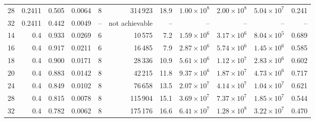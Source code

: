 \documentclass[11pt]{article}
\begin{document}
{\begin{longtable}{rrrrrrrrrrr}
28 & 0.2411 & 0.505 & 0.0064 & 8 & 314\,923 & 18.9 & $1.00\times10^{8}$ & $2.00\times10^{8}$ & $5.04\times10^{7}$ & 0.241 \\
32 & 0.2411 & 0.442 & 0.0049 & -- & not achievable & -- & -- & -- & -- & -- \\
14 & 0.4 & 0.933 & 0.0269 & 6 & 10\,575 & 7.2 & $1.59\times10^{6}$ & $3.17\times10^{6}$ & $8.04\times10^{5}$ & 0.689 \\
16 & 0.4 & 0.917 & 0.0211 & 6 & 16\,485 & 7.9 & $2.87\times10^{6}$ & $5.74\times10^{6}$ & $1.45\times10^{6}$ & 0.585 \\
18 & 0.4 & 0.900 & 0.0171 & 8 & 28\,336 & 10.9 & $5.61\times10^{6}$ & $1.12\times10^{7}$ & $2.83\times10^{6}$ & 0.602 \\
20 & 0.4 & 0.883 & 0.0142 & 8 & 42\,215 & 11.8 & $9.37\times10^{6}$ & $1.87\times10^{7}$ & $4.73\times10^{6}$ & 0.717 \\
24 & 0.4 & 0.849 & 0.0102 & 8 & 76\,658 & 13.5 & $2.07\times10^{7}$ & $4.14\times10^{7}$ & $1.04\times10^{7}$ & 0.621 \\
28 & 0.4 & 0.815 & 0.0078 & 8 & 115\,904 & 15.1 & $3.69\times10^{7}$ & $7.37\times10^{7}$ & $1.85\times10^{7}$ & 0.544 \\
32 & 0.4 & 0.782 & 0.0062 & 8 & 175\,176 & 16.6 & $6.41\times10^{7}$ & $1.28\times10^{8}$ & $3.22\times10^{7}$ & 0.470 \\
\end{longtable}
}
\end{document}
